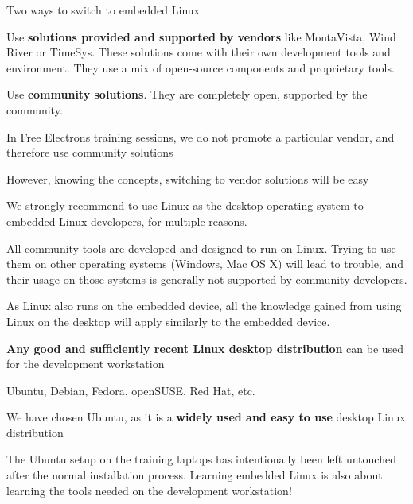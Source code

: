   \startitemize
  \item Two ways to switch to embedded Linux
    \startitemize
    \item Use {\bf solutions provided and supported by vendors} like
      MontaVista, Wind River or TimeSys. These solutions come with
      their own development tools and environment. They use a mix of
      open-source components and proprietary tools.
    \item Use {\bf community solutions}. They are completely open,
      supported by the community.
    \stopitemize
  \item In Free Electrons training sessions, we do not promote a particular
    vendor, and therefore use community solutions
    \startitemize
    \item However, knowing the concepts, switching to vendor solutions will be easy
    \stopitemize
  \stopitemize

  \startitemize
  \item We strongly recommend to use Linux as the desktop operating
    system to embedded Linux developers, for multiple reasons.
  \item All community tools are developed and designed to run on
    Linux. Trying to use them on other operating systems (Windows, Mac
    OS X) will lead to trouble, and their usage on those systems is
    generally not supported by community developers.
  \item As Linux also runs on the embedded device, all the knowledge
    gained from using Linux on the desktop will apply similarly to the
    embedded device.
  \stopitemize

  \startitemize
    \item {\bf Any good and sufficiently recent Linux desktop
        distribution} can be used for the development workstation
      \startitemize
      \item Ubuntu, Debian, Fedora, openSUSE, Red Hat, etc.
      \stopitemize
    \item We have chosen Ubuntu, as it is a {\bf widely used and easy to
        use} desktop Linux distribution
    \item The Ubuntu setup on the training laptops has intentionally
      been left untouched after the normal installation
      process. Learning embedded Linux is also about learning the tools
      needed on the development workstation!
    \stopitemize


